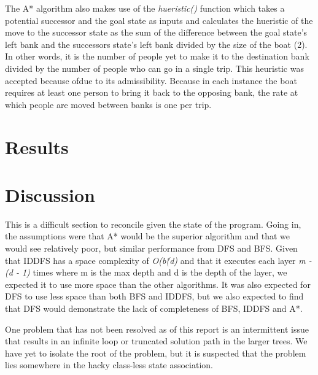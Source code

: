 \documentclass[journal]{IEEEtran}
\begin{document}
\noindent The A* algorithm also makes use of the \textit{hueristic()} function
which takes a potential successor and the goal state as inputs and calculates the
hueristic of the move to the successor state as the sum of the difference between
the goal state's left bank and the successors state's left bank divided by
the size of the boat (2). In other words, it is the number of people yet to make 
it to the destination bank divided by the number of people who can go in a single
trip. This heuristic was accepted because ofdue to its admissibility. Because in each
instance the boat requires at least one person to bring it back to the opposing
bank, the rate at which people are moved between banks is one per trip. \medskip



\section{Results}



\section{Discussion}
\noindent This is a difficult section to reconcile given the state of the program. 
Going in, the assumptions were that A* would be the superior algorithm and that we
would see relatively poor, but similar performance from DFS and BFS. Given that
IDDFS has a space complexity of \textit{O(b\^(d)} and that it executes each layer
\textit{m - (d - 1)} times where m is the max depth and d is the depth of the layer,
we expected it to use more space than the other algorithms. It was also expected for 
DFS to use less space than both BFS and IDDFS, but we also expected to find that DFS 
would demonstrate the lack of completeness of BFS, IDDFS and A*. \smallskip

\noindent One problem that has not been resolved as of this report is an intermittent
issue that results in an infinite loop or truncated solution path in the larger trees.
We have yet to isolate the root of the problem, but it is suspected that the problem
lies somewhere in the hacky class-less state association. \\
\end{document}
